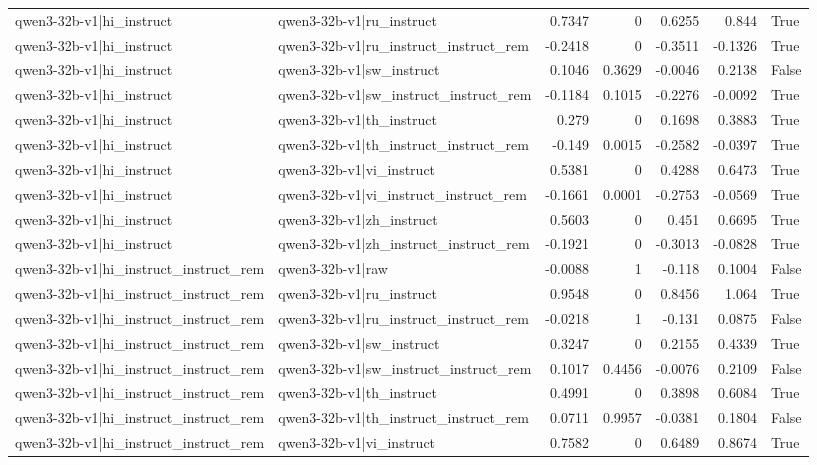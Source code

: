 \begin{table}
\begin{tabular}{l l r r r r l}
qwen3-32b-v1|hi_instruct & qwen3-32b-v1|ru_instruct & 0.7347 & 0 & 0.6255 & 0.844 & True \\
qwen3-32b-v1|hi_instruct & qwen3-32b-v1|ru_instruct_instruct_rem & -0.2418 & 0 & -0.3511 & -0.1326 & True \\
qwen3-32b-v1|hi_instruct & qwen3-32b-v1|sw_instruct & 0.1046 & 0.3629 & -0.0046 & 0.2138 & False \\
qwen3-32b-v1|hi_instruct & qwen3-32b-v1|sw_instruct_instruct_rem & -0.1184 & 0.1015 & -0.2276 & -0.0092 & True \\
qwen3-32b-v1|hi_instruct & qwen3-32b-v1|th_instruct & 0.279 & 0 & 0.1698 & 0.3883 & True \\
qwen3-32b-v1|hi_instruct & qwen3-32b-v1|th_instruct_instruct_rem & -0.149 & 0.0015 & -0.2582 & -0.0397 & True \\
qwen3-32b-v1|hi_instruct & qwen3-32b-v1|vi_instruct & 0.5381 & 0 & 0.4288 & 0.6473 & True \\
qwen3-32b-v1|hi_instruct & qwen3-32b-v1|vi_instruct_instruct_rem & -0.1661 & 0.0001 & -0.2753 & -0.0569 & True \\
qwen3-32b-v1|hi_instruct & qwen3-32b-v1|zh_instruct & 0.5603 & 0 & 0.451 & 0.6695 & True \\
qwen3-32b-v1|hi_instruct & qwen3-32b-v1|zh_instruct_instruct_rem & -0.1921 & 0 & -0.3013 & -0.0828 & True \\
qwen3-32b-v1|hi_instruct_instruct_rem & qwen3-32b-v1|raw & -0.0088 & 1 & -0.118 & 0.1004 & False \\
qwen3-32b-v1|hi_instruct_instruct_rem & qwen3-32b-v1|ru_instruct & 0.9548 & 0 & 0.8456 & 1.064 & True \\
qwen3-32b-v1|hi_instruct_instruct_rem & qwen3-32b-v1|ru_instruct_instruct_rem & -0.0218 & 1 & -0.131 & 0.0875 & False \\
qwen3-32b-v1|hi_instruct_instruct_rem & qwen3-32b-v1|sw_instruct & 0.3247 & 0 & 0.2155 & 0.4339 & True \\
qwen3-32b-v1|hi_instruct_instruct_rem & qwen3-32b-v1|sw_instruct_instruct_rem & 0.1017 & 0.4456 & -0.0076 & 0.2109 & False \\
qwen3-32b-v1|hi_instruct_instruct_rem & qwen3-32b-v1|th_instruct & 0.4991 & 0 & 0.3898 & 0.6084 & True \\
qwen3-32b-v1|hi_instruct_instruct_rem & qwen3-32b-v1|th_instruct_instruct_rem & 0.0711 & 0.9957 & -0.0381 & 0.1804 & False \\
qwen3-32b-v1|hi_instruct_instruct_rem & qwen3-32b-v1|vi_instruct & 0.7582 & 0 & 0.6489 & 0.8674 & True \\

\end{tabular}
\end{table}
